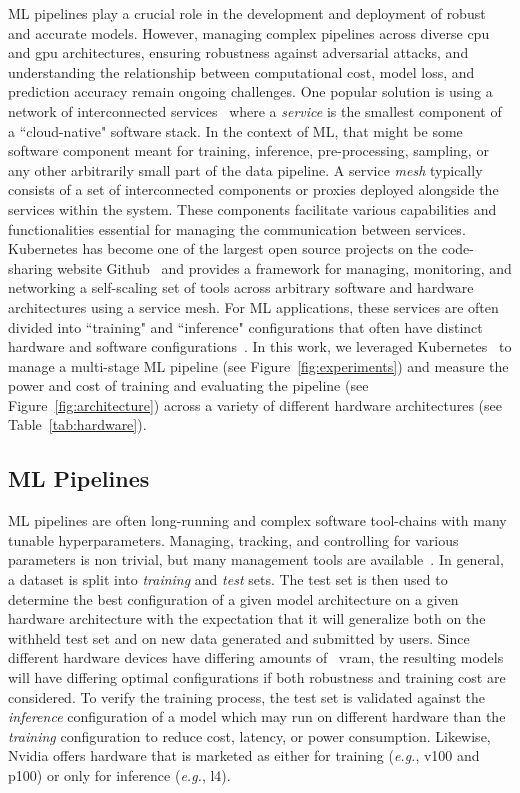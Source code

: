 \documentclass[sn-mathphys-num]{sn-jnl}%
\begin{document}
ML pipelines play a crucial role in the development and deployment of robust and accurate models. However, managing complex pipelines across diverse \acrfull{cpu} and \acrfull{gpu}  architectures, ensuring robustness against adversarial attacks, and understanding the relationship between computational cost, model loss, and prediction accuracy remain ongoing challenges.
One popular solution is using a network of interconnected services~\cite{panchal2024reusable,hasselbring2017microservice,zhou2022online,singh2023load} where a \textit{service} is the smallest component of a ``cloud-native" software stack. In the context of ML, that might be some software component meant for training, inference, pre-processing, sampling, or any other arbitrarily small part of the data pipeline. 
A service \textit{mesh} typically consists of a set of interconnected components or proxies deployed alongside the services within the system.  These components facilitate various capabilities and functionalities essential for managing the communication between services. Kubernetes has become one of the largest open source projects on the code-sharing website Github~\cite{k8s-size} and provides a framework for managing, monitoring, and networking a self-scaling set of tools across arbitrary software and hardware architectures using a service mesh. For ML applications, these services are often divided into ``training" and ``inference" configurations that often have distinct hardware and software configurations~\cite{wang2019benchmarking}. In this work, we leveraged Kubernetes~\cite{k8s} to manage a multi-stage ML pipeline (see Figure~\ref{fig:experiments}) and measure the power and cost of training and evaluating the pipeline (see Figure~\ref{fig:architecture}) across a variety of different hardware architectures (see Table~\ref{tab:hardware}).


\subsection{ML Pipelines}
\label{ml_pipelines}
ML pipelines are often long-running and complex software tool-chains with many tunable hyperparameters. 
Managing, tracking, and controlling for various parameters is non trivial, but many management tools are available~\cite{dvc,hydra,k8s}. 
In general, a dataset is split into \textit{training} and \textit{test} sets. 
The test set is then used to determine the best configuration of a given model architecture on a given hardware architecture with the expectation that it will generalize both on the withheld test set and on new data generated and submitted by users. 
Since different hardware devices have differing amounts of ~\acrfull{vram}, the resulting models will have differing optimal configurations if both robustness and training cost are considered.
To verify the training process, the test set is validated against the \textit{inference} configuration of a model which may run on different hardware than the \textit{training} configuration to reduce cost, latency, or power consumption. Likewise, Nvidia offers hardware that is marketed as either for training (\textit{e.g.}, v100 and p100) or only for inference (\textit{e.g.}, l4).
\end{document}
